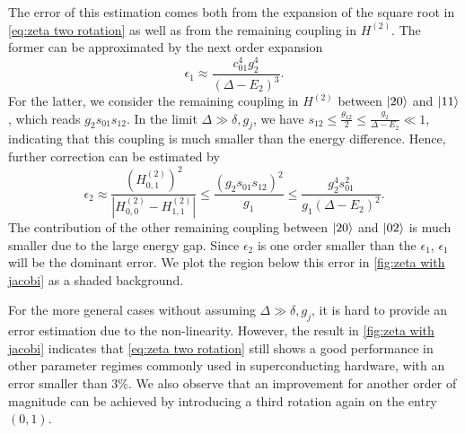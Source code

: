 \documentclass[%
 reprint,
 amsmath,amssymb,
 aps,
pra,
noeprint,
superscriptaddress,
]{revtex4-2}
\begin{document}
The error of this estimation comes both from the expansion of the square root in \cref{eq:zeta two rotation} as well as from the remaining coupling in $H^{(2)}$.
The former can be approximated by the next order expansion
\begin{equation}
    \label{eq:jacobi example error}
    \epsilon_1 \approx \frac{c_{01}^4 g_2^4}{(\Delta - E_2)^3}
    .
\end{equation}
For the latter, we consider the remaining coupling in $H^{(2)}$ between $\ket{20}$ and $\ket{11}$, which reads $g_2 s_{01} s_{12}$.
In the limit $\Delta \gg \delta, g_j$, we have
$s_{12} \le
\frac{\theta_{12}}{2} \le
\frac{g_2}{\Delta-E_2} \ll 1$,
indicating that this coupling is much smaller than the energy difference.
Hence, further correction can be estimated by
\begin{equation}
    \epsilon_2 \approx
    \frac{{\left(H^{(2)}_{0,1}\right)}^2}{|H^{(2)}_{0,0} - H^{(2)}_{1,1}|} \le \frac{(g_2 s_{01} s_{12})^2}{g_1} \le \frac{g_2^4  s_{01}^2}{g_1(\Delta-E_2)^2}
    .
\end{equation}
The contribution of the other remaining coupling between $\ket{20}$ and $\ket{02}$ is much smaller due to the large energy gap.
Since $\epsilon_2$ is one order smaller than the $\epsilon_1$, $\epsilon_1$ will be the dominant error.
We plot the region below this error in \cref{fig:zeta with jacobi} as a shaded background.

For the more general cases without assuming $\Delta \gg \delta, g_j$, it is hard to provide an error estimation due to the non-linearity.
However, the result in \cref{fig:zeta with jacobi} indicates that \cref{eq:zeta two rotation} still shows a good performance in other parameter regimes commonly used in superconducting hardware, with an error smaller than 3\%.
We also observe that an improvement for another order of magnitude can be achieved by introducing a third rotation again on the entry $(0,1)$.
\end{document}
